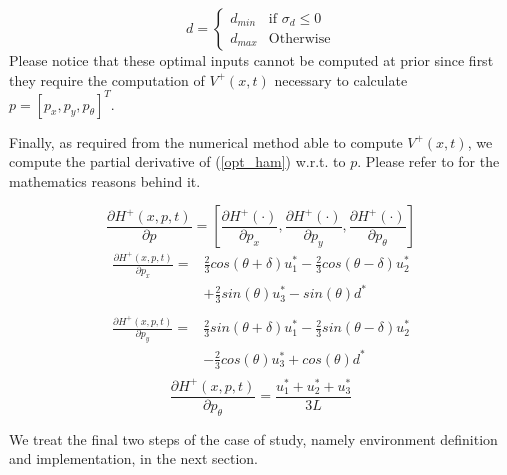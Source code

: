 \begin{equation}
  d= 
	\begin{cases} 
		d_{min} &\text{if } \sigma_{d} \leq 0\\
		d_{max} &\text{Otherwise} 
	\end{cases}
  \label{opt_d}
\end{equation}
Please notice that these optimal inputs cannot be computed at prior since first they require the computation of $V^+(x,t)$ necessary to calculate $p = [p_x, p_y, p_{\theta}]^T$.

Finally, as required from the numerical method able to compute $V^+(x,t)$, we compute the partial derivative of (\ref{opt_ham}) w.r.t. to $p$. Please refer to \cite{new_paper} \cite{mitch_phd} for the mathematics reasons behind it.

\begin{equation}
  \frac{\partial H^+(x,p,t)}{\partial p} = 
    \left[
      \frac{\partial H^+(\cdot)}{\partial p_x},
      \frac{\partial H^+(\cdot)}{\partial p_y},
      \frac{\partial H^+(\cdot)}{\partial p_{\theta}}    
    \right]
\end{equation}
\begin{equation*}
  \begin{split}
    \frac{\partial H^+(x,p,t)}{\partial p_x} =
    &
    \frac{2}{3}cos(\theta+\delta)u_1^* - \frac{2}{3}cos(\theta-\delta)u_2^* \\
    &
    + \frac{2}{3}sin(\theta)u_3^* - sin(\theta)d^* \\
  \end{split}
\end{equation*}
\begin{equation*}
  \begin{split}
    \frac{\partial H^+(x,p,t)}{\partial p_y} =
    &
    \frac{2}{3}sin(\theta+\delta)u_1^* - \frac{2}{3}sin(\theta-\delta)u_2^* \\
    &
    - \frac{2}{3}cos(\theta)u_3^* + cos(\theta)d^* \\
  \end{split}
\end{equation*}
\begin{equation*}
    \frac{\partial H^+(x,p,t)}{\partial p_{\theta}} = \frac{u_1^* + u_2^* + u_3^*}{3L} 
\end{equation*}

We treat the final two steps of the case of study, namely environment definition and implementation, in the next section.



